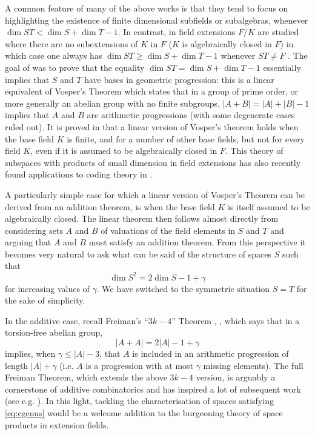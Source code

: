 \documentclass{article}
\theoremstyle{plain}
\theoremstyle{definition}
\theoremstyle{remark}
\renewcommand{\geq}{\geqslant}
\renewcommand{\leq}{\leqslant}
\begin{document}
A common feature of {many of} the above works is that they tend to focus on
highlighting the existence of finite dimensional subfields or
subalgebras, whenever $\dim ST < \dim S + \dim T -1$.  In contrast, in
\cite{bszVosper} field extensions $F/K$ are studied where there are no
subextensions of $K$ in $F$ ($K$ is algebraically closed in $F$) in
which case one always has $\dim ST \geq \dim S +\dim T -1$ whenever
$ST\neq F$ \cite{el09}. The goal of \cite{bszVosper} was to prove that
the equality $\dim ST = \dim S +\dim T -1$ essentially implies that
$S$ and $T$ have bases in geometric progression: this is a linear
equivalent of Vosper's Theorem \cite{Vosper} which states that in a
group of prime order, or more generally an abelian group with no
finite subgroups, $|A+B|=|A|+|B|-1$ implies that $A$ and $B$ are
arithmetic progressions (with some degenerate cases ruled out).  It is
proved in \cite{bszVosper} that a linear version of Vosper's theorem
holds when the base field $K$ is finite, and for a number of other
base fields, but not for every field
$K$, even if it is assumed to be algebraically closed in $F$.
{This theory of
  subspaces with products of small dimension in field extensions has
  also recently found applications to coding theory in \cite{RRT18}.}

A particularly simple case for which a linear version of Vosper's
Theorem can be derived from an addition theorem, is when the base
field $K$ is itself assumed to be algebraically closed. The linear
theorem then follows almost directly from considering sets $A$ and $B$ of 
valuations of the field elements in $S$ and $T$ and arguing that $A$ 
and $B$ must satisfy an addition theorem. From this perspective it
becomes very natural to ask what can be said of the structure of
spaces $S$ such that
\begin{equation}
  \label{eq:cgenus}
  \dim S^2 =2\dim S -1 +\gamma
\end{equation}
for increasing values of $\gamma$. We have switched to the symmetric
situation $S=T$ for the sake of simplicity.

In the additive case, recall Freiman's
``$3k-4$'' Theorem \cite{Freiman}, \cite[Th. 5.11]{TaoVu}, which says
that in a torsion-free abelian group,
  $$|A+A|=2|A|-1+\gamma$$
  implies, when $\gamma\leq |A|-3$, that $A$ is included in an
  arithmetic progression of length $|A|+\gamma$ (i.e. $A$ is a
  progression with at most $\gamma$ missing elements).
  {The full Freiman Theorem, which extends the above
    $3k-4$ version, is arguably a cornerstone of additive
    combinatorics and has inspired a lot of subsequent work (see
    e.g. \cite{TaoVu}).  In this light, tackling the characterisation
    of spaces satisfying \eqref{eq:cgenus} would be a welcome addition
    to the burgeoning theory of space products in extension fields.}
\end{document}
